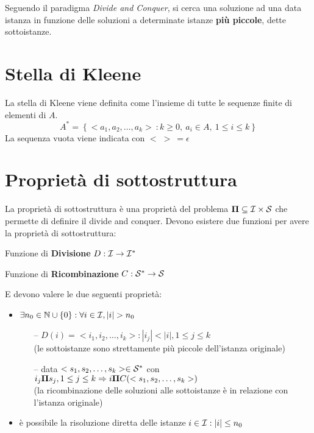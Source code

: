 Seguendo il paradigma \textit{Divide and Conquer}, si cerca una soluzione ad una data istanza in funzione delle soluzioni a determinate istanze \textbf{più piccole}, dette sottoistanze.

\section{Stella di Kleene}
\begin{definition}\label{def:kleene}
    La stella di Kleene viene definita come l'insieme di tutte le sequenze finite di elementi di $A$.
    $$ A^* = \left\{ < a_1, a_2, \dots, a_k > \: : k \geq 0, \: a_i \in A, \: 1 \leq i \leq k \right\}$$
    La sequenza vuota viene indicata con $ < \; > \: = \epsilon $
\end{definition}

\section{Proprietà di sottostruttura}

La proprietà di sottostruttura è una proprietà del problema $\bm{\Pi}{} \subseteq \mathcal{I}{} \times \mathcal{S}{} $ che permette di definire il divide and conquer. Devono esistere due funzioni per avere la proprietà di sottostruttura:

\begin{description}
    \item{Funzione di \textbf{Divisione}} $ D : \mathcal{I}{} \to \mathcal{I}{}^*$
    \item{Funzione di \textbf{Ricombinazione}} $ C : \mathcal{S}{}^* \to \mathcal{S}{}$
\end{description}

E devono valere le due seguenti proprietà:
\begin{itemize}
    \item $\exists n_0 \in \mathbb{N} \cup \{0\} : \forall i \in \mathcal{I}{}, |i| > n_0 $
        \begin{itemize}
            \item[--] $ D(i)=<i_1, i_2, \dots, i_k>:|i_j|<|i|, 1 \leq j \leq k$ \\
                (le sottoistanze sono strettamente più piccole dell'istanza originale)
            \item[--] data $ <s_1, s_2, \dots, s_k> \in \mathcal{S}{}^* $ con $i_j \bm{\Pi}{} s_j,  1 \leq j \leq k \Rightarrow i \bm{\Pi}{} C(<s_1, s_2, \dots, s_k>)$ \\
                (la ricombinazione delle soluzioni alle sottoistanze è in relazione con l'istanza originale)
        \end{itemize}
    \item è possibile la risoluzione diretta delle istanze $ i \in \mathcal{I}{} : |i| \leq n_0 $
\end{itemize}

